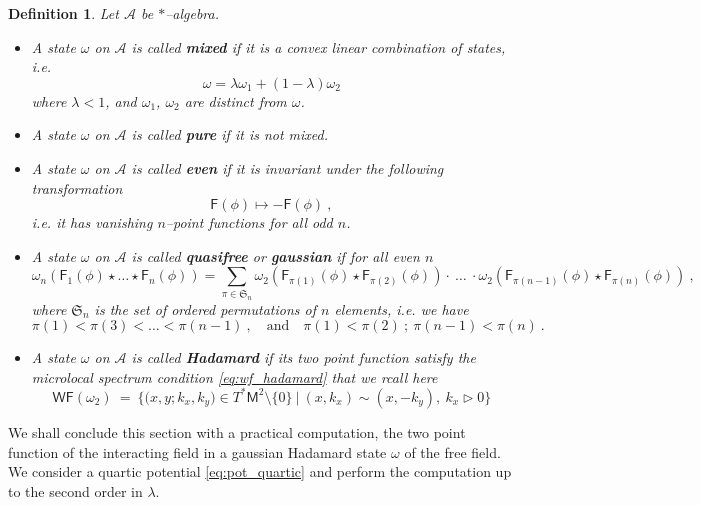 \documentclass[11pt]{book}
\newcommand{\WF}{\mathsf{WF}}
\newcommand{\Acal}{\mathcal{A}}
\newcommand{\Srak}{\mathfrak{S}}
\newcommand{\Fsf}{\mathsf{F}}
\newcommand{\Msf}{\mathsf{M}}
\theoremstyle{break}
\newtheorem{definition}{Definition}[chapter]
\begin{document}
\begin{definition}
Let $\Acal$ be $\ast$--algebra.  
%
\begin{itemize}
%
%
%
\item A state $\omega$ on $\Acal$ is called \textbf{mixed} if it is a convex linear combination of states, i.e.
%
\begin{equation*}
\omega = \lambda \omega_1 + (1-\lambda) \omega_2 
\end{equation*}
%
where $\lambda < 1$, and $\omega_1$, $\omega_2$ are distinct from $\omega$.
%
%
%
\item A state $\omega$ on $\Acal$ is called \textbf{pure} if it is not mixed.
%
%
%
\item A state $\omega$ on $\Acal$ is called \textbf{even} if it is invariant under the following transformation
%
\begin{equation*}
\Fsf(\phi) \mapsto - \Fsf(\phi) \ , 
\end{equation*}
%
i.e. it has vanishing $n$--point functions for all odd $n$.
%
%
%
\item A state $\omega$ on $\Acal$ is called \textbf{quasifree} or \textbf{gaussian} if for all even $n$
%
\begin{equation*}
\omega_n\left( \Fsf_1(\phi) \star \dots \star \Fsf_n(\phi) \right) =  \sum_{\pi \in \Srak_n} \omega_2\left( \Fsf_{\pi(1)}(\phi) \star \Fsf_{\pi(2)}(\phi) \right) \cdot \ \dots \ \cdot \omega_2\left( \Fsf_{\pi(n-1)}(\phi) \star \Fsf_{\pi(n)}(\phi) \right) \ ,
\end{equation*}
%
where $\Srak_n$ is the set of ordered permutations of $n$ elements, i.e. we have 
%
\begin{equation*}
\pi(1) < \pi(3) < \dots < \pi(n-1) \ , \quad \mbox{and} \quad \pi(1) < \pi(2) \ ;  \ \pi(n-1) < \pi(n) \ . 
\end{equation*}
%
%
%
\item A state $\omega$ on $\Acal$ is called \textbf{Hadamard} if its two point function satisfy the microlocal spectrum condition \eqref{eq:wf_hadamard} that we rcall here
%
\begin{equation*}
\WF(\omega_2) \ = \ \bigg\{ \bigg( x, y ; k_x, k_y \bigg) \in T^\ast\Msf^2 \setminus \{0\} \ \bigg| \ (x,k_x) \sim (x,-k_y), \ k_x \triangleright 0 \bigg\}  
\end{equation*}
%
%
%
\end{itemize}
\end{definition}


We shall conclude this section with a practical computation, the two point function of the interacting field in a gaussian Hadamard state $\omega$ of the free field. We consider a quartic potential \eqref{eq:pot_quartic} and perform the computation up to the second order in $\lambda$. 
\end{document}
